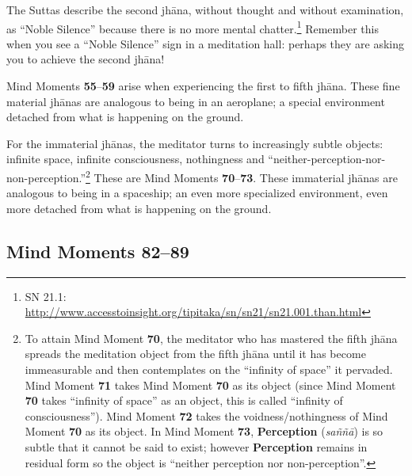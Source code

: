 The Suttas describe the second jhāna, without thought and without examination, as “Noble Silence” because there is no more mental chatter.\footnote{SN 21.1: \url{http://www.accesstoinsight.org/tipitaka/sn/sn21/sn21.001.than.html}} Remember this when you see a “Noble Silence” sign in a meditation hall: perhaps they are asking you to achieve the second jhāna!

Mind Moments \textbf{55}--\textbf{59} arise when experiencing the first to fifth jhāna. These fine material jhānas are analogous to being in an aeroplane; a special environment detached from what is happening on the ground.

For the immaterial jhānas, the meditator turns to increasingly subtle objects: infinite space, infinite consciousness, nothingness and “neither-perception-nor-non-perception.”\footnote{To attain Mind Moment \textbf{70}, the meditator who has mastered the fifth jhāna spreads the meditation object from the fifth jhāna until it has become immeasurable and then contemplates on the “infinity of space” it pervaded. Mind Moment \textbf{71} takes Mind Moment \textbf{70} as its object (since Mind Moment \textbf{70} takes “infinity of space” as an object, this is called “infinity of consciousness”). Mind Moment \textbf{72} takes the voidness/nothingness of Mind Moment \textbf{70} as its object. In Mind Moment \textbf{73}, \textbf{Perception} (\textit{saññā}) is so subtle that it cannot be said to exist; however \textbf{Perception} remains in residual form so the object is “neither perception nor non-perception”.} These are Mind Moments \textbf{70}--\textbf{73}. These immaterial jhānas are analogous to being in a spaceship; an even more specialized environment, even more detached from what is happening on the ground.

\subsection*{Mind Moments 82--89}

